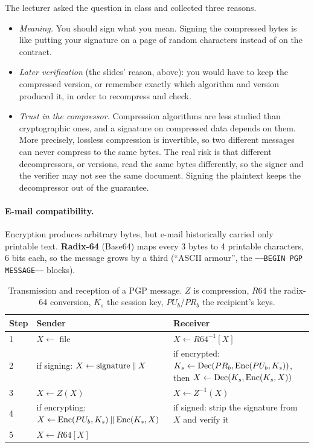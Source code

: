 \begin{remark}
The lecturer asked the question in class and collected three reasons.
\begin{itemize}
    \item \emph{Meaning.} You should sign what you mean. Signing the compressed bytes is like putting your signature on a page of random characters instead of on the contract.
    \item \emph{Later verification} (the slides' reason, above): you would have to keep the compressed version, or remember exactly which algorithm and version produced it, in order to recompress and check.
    \item \emph{Trust in the compressor.} Compression algorithms are less studied than cryptographic ones, and a signature on compressed data depends on them. More precisely, lossless compression is invertible, so two different messages can never compress to the same bytes. The real risk is that different decompressors, or versions, read the same bytes differently, so the signer and the verifier may not see the same document. Signing the plaintext keeps the decompressor out of the guarantee.
\end{itemize}
\end{remark}

\paragraph{E-mail compatibility.} Encryption produces arbitrary bytes, but e-mail historically carried only printable text. \textbf{Radix-64} (Base64) maps every 3 bytes to 4 printable characters, 6 bits each, so the message grows by a third (\enquote{ASCII armour}, the \texttt{-----BEGIN PGP MESSAGE-----} blocks).

\begin{table}[H]
\centering
\caption{Transmission and reception of a PGP message. $Z$ is compression, $R64$ the radix-64 conversion, $K_s$ the session key, $PU_b$/$PR_b$ the recipient's keys.}
\label{tab:pgp-pipeline}
\begin{tabularx}{\textwidth}{@{}l X X@{}}
\toprule
Step & Sender & Receiver \\
\midrule
1 & $X \leftarrow$ file & $X \leftarrow R64^{-1}[X]$ \\
2 & if signing: $X \leftarrow \text{signature} \mathbin{\|} X$ & if encrypted: $K_s \leftarrow \operatorname{Dec}(PR_b, \operatorname{Enc}(PU_b, K_s))$, then $X \leftarrow \operatorname{Dec}(K_s, \operatorname{Enc}(K_s, X))$ \\
3 & $X \leftarrow Z(X)$ & $X \leftarrow Z^{-1}(X)$ \\
4 & if encrypting: $X \leftarrow \operatorname{Enc}(PU_b, K_s) \mathbin{\|} \operatorname{Enc}(K_s, X)$ & if signed: strip the signature from $X$ and verify it \\
5 & $X \leftarrow R64[X]$ & \\
\bottomrule
\end{tabularx}
\end{table}

